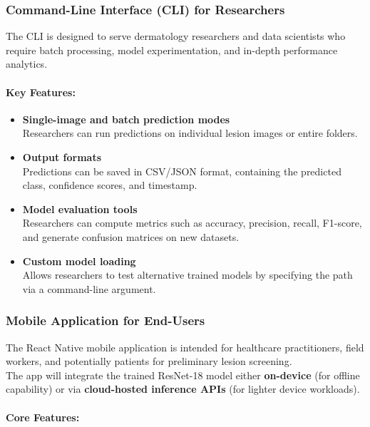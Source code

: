 \documentclass[
  12pt,
  oneside]{article}
\providecommand{\tightlist}{%
  \setlength{\itemsep}{0pt}\setlength{\parskip}{0pt}}
\begin{document}
\subsubsection{Command-Line Interface (CLI) for
Researchers}\label{command-line-interface-cli-for-researchers}

The CLI is designed to serve dermatology researchers and data scientists
who require batch processing, model experimentation, and in-depth
performance analytics.

\paragraph{Key Features:}\label{key-features}

\begin{itemize}
\tightlist
\item
  \textbf{Single-image and batch prediction modes}\\
  Researchers can run predictions on individual lesion images or entire
  folders.
\item
  \textbf{Output formats}\\
  Predictions can be saved in CSV/JSON format, containing the predicted
  class, confidence scores, and timestamp.
\item
  \textbf{Model evaluation tools}\\
  Researchers can compute metrics such as accuracy, precision, recall,
  F1-score, and generate confusion matrices on new datasets.
\item
  \textbf{Custom model loading}\\
  Allows researchers to test alternative trained models by specifying
  the path via a command-line argument.
\end{itemize}

\subsubsection{Mobile Application for
End-Users}\label{mobile-application-for-end-users}

The React Native mobile application is intended for healthcare
practitioners, field workers, and potentially patients for preliminary
lesion screening.\\
The app will integrate the trained ResNet-18 model either
\textbf{on-device} (for offline capability) or via \textbf{cloud-hosted
inference APIs} (for lighter device workloads).

\paragraph{Core Features:}\label{core-features}
\end{document}
